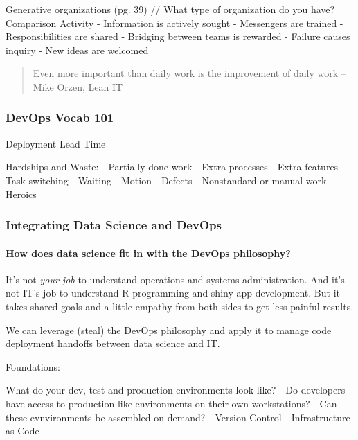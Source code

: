 \documentclass[]{book}
\let\oldparagraph\paragraph
\renewcommand{\paragraph}[1]{\oldparagraph{#1}\mbox{}}
\theoremstyle{definition}
\theoremstyle{definition}
\theoremstyle{definition}
\theoremstyle{remark}
\begin{document}
Generative organizations (pg. 39) // What type of organization do you
have? Comparison Activity - Information is actively sought - Messengers
are trained - Responsibilities are shared - Bridging between teams is
rewarded - Failure causes inquiry - New ideas are welcomed

\begin{quote}
Even more important than daily work is the improvement of daily work
--Mike Orzen, Lean IT
\end{quote}

\hypertarget{devops-vocab-101}{%
\subsubsection{DevOps Vocab 101}\label{devops-vocab-101}}

Deployment Lead Time

Hardships and Waste: - Partially done work - Extra processes - Extra
features - Task switching - Waiting - Motion - Defects - Nonstandard or
manual work - Heroics

\hypertarget{integrating-data-science-and-devops}{%
\subsubsection{Integrating Data Science and
DevOps}\label{integrating-data-science-and-devops}}

\hypertarget{how-does-data-science-fit-in-with-the-devops-philosophy}{%
\paragraph{How does data science fit in with the DevOps
philosophy?}\label{how-does-data-science-fit-in-with-the-devops-philosophy}}

It's not \emph{your job} to understand operations and systems
administration. And it's not IT's job to understand R programming and
shiny app development. But it takes shared goals and a little empathy
from both sides to get less painful results.

We can leverage (steal) the DevOps philosophy and apply it to manage
code deployment handoffs between data science and IT.

Foundations:

What do your dev, test and production environments look like? - Do
developers have access to production-like environments on their own
workstations? - Can these evnvironments be assembled on-demand? -
Version Control - Infrastructure as Code
\end{document}
